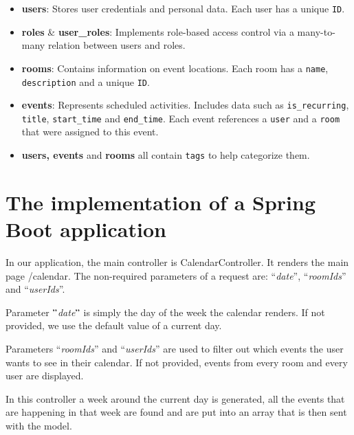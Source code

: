 \begin{itemize}
  \item \textbf{users}: Stores user credentials and personal data.
  Each user has a unique \texttt{ID}.

  \item \textbf{roles} \& \textbf{user\_roles}: Implements role-based access control via a many-to-many relation between users and roles.

  \item \textbf{rooms}: Contains information on event locations.
  Each room has a \texttt{name}, \texttt{description} and a unique \texttt{ID}.

  \item \textbf{events}: Represents scheduled activities.
  Includes data such as  \texttt{is\_recurring}, \texttt{title}, \texttt{start\_time} and \texttt{end\_time}.
  Each event references a \texttt{user} and a \texttt{room} that were assigned to this event.

  \item \textbf{users, events }and \textbf{rooms} all contain \texttt{tags} to help categorize them.
\end{itemize}


\newpage%

\section{The implementation of a Spring Boot application}\label{sec:the-implementation-of-a-spring-boot-application}
In our application, the main controller is CalendarController.
It renders the main page /calendar.
The non-required parameters of a request are: ``\textit{date}'', ``\textit{roomIds}'' and ``\textit{userIds}''.

Parameter \("\)\textit{date}\("\) is simply the day of the week the calendar renders.
If not provided, we use the default value of a current day.

Parameters ``\textit{roomIds}'' and ``\textit{userIds}'' are used to filter out which events the user wants to see in their calendar.
If not provided, events from every room and every user are displayed.

In this controller a week around the current day is generated, all the events that are happening in that week are found and are put into an array that is then sent with the model.





